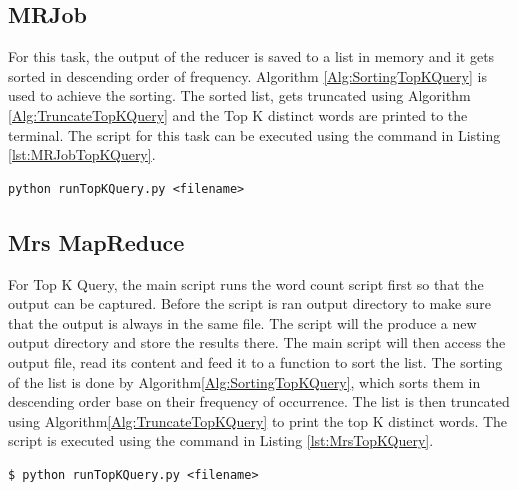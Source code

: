 \documentclass[10pt, twocolumn]{article}
\begin{document}
\subsection{MRJob}
%
For this task, the output of the reducer is saved to a list in memory and it gets sorted in descending order of frequency. Algorithm \ref*{Alg:SortingTopKQuery} is used to achieve the sorting. The sorted list, gets truncated using Algorithm\,\ref*{Alg:TruncateTopKQuery} and the Top K distinct words are printed to the terminal. The script for this task can be executed using the command in Listing\,\ref*{lst:MRJobTopKQuery}.
%
\begin{center}
\begin{minipage}{0.95\columnwidth}
\begin{lstlisting}[style=bashStyle, label=lst:MRJobTopKQuery, caption = Command to execute Top-K Query using MRJob]
python runTopKQuery.py <filename>
\end{lstlisting}
\end{minipage}
\end{center}
%
\subsection{Mrs MapReduce}
%
For Top K Query, the main script runs the word count script first so that the output can be captured. Before the script is ran output directory to make sure that the output is always in the same file. The script will the produce a new output directory and store the results there. The main script will then access the output file, read its content and feed it to a function to sort the list. The sorting of the list is done by Algorithm\;\;\ref*{Alg:SortingTopKQuery}, which sorts them in descending order base on their frequency of occurrence. The list is then truncated using Algorithm\;\;\ref*{Alg:TruncateTopKQuery} to print the top K distinct words. The script is executed using the command in Listing \ref*{lst:MrsTopKQuery}.
%
\begin{center}
\begin{minipage}{0.95\columnwidth}
\begin{lstlisting}[style=bashStyle, label=lst:MrsTopKQuery, caption = Command to execute Top K Query (Mrs)]
$ python runTopKQuery.py <filename>
\end{lstlisting}
\end{minipage}
\end{center}
%

%
\end{document}

